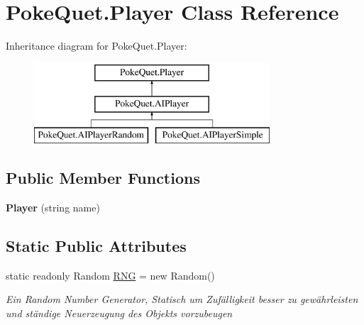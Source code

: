 \hypertarget{class_poke_quet_1_1_player}{}\section{Poke\+Quet.\+Player Class Reference}
\label{class_poke_quet_1_1_player}
Inheritance diagram for Poke\+Quet.\+Player\+:\begin{figure}[H]
\begin{center}
\leavevmode
\includegraphics[height=3.000000cm]{class_poke_quet_1_1_player}
\end{center}
\end{figure}
\subsection*{Public Member Functions}
\begin{DoxyCompactItemize}
\item 
\mbox{\label{class_poke_quet_1_1_player_ad78e2de62603112285cf59a609d5c705}} 
{\bfseries Player} (string name)
\end{DoxyCompactItemize}
\subsection*{Static Public Attributes}
\begin{DoxyCompactItemize}
\item 
static readonly Random \mbox{\hyperlink{class_poke_quet_1_1_player_a0ea964b34febb9e63ed847d944ffcadf}{R\+NG}} = new Random()
\begin{DoxyCompactList}\small\item\em Ein Random Number Generator, Statisch um Zufälligkeit besser zu gewährleisten und ständige Neuerzeugung des Objekts vorzubeugen \end{DoxyCompactList}\end{DoxyCompactItemize}
